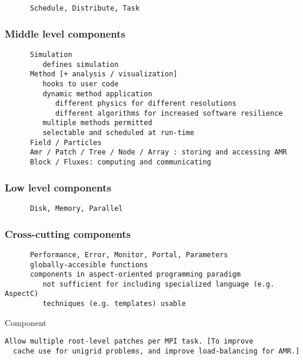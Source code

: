 \documentclass{article}
\begin{document}
\begin{verbatim}
      Schedule, Distribute, Task
\end{verbatim}

\subsubsection{Middle level components}

\begin{verbatim}
      Simulation
         defines simulation
      Method [+ analysis / visualization]
         hooks to user code
         dynamic method application
            different physics for different resolutions
            different algorithms for increased software resilience
         multiple methods permitted
         selectable and scheduled at run-time
      Field / Particles 
      Amr / Patch / Tree / Node / Array : storing and accessing AMR
      Block / Fluxes: computing and communicating
\end{verbatim}

\subsubsection{Low level components}

\begin{verbatim}
      Disk, Memory, Parallel      
\end{verbatim}

\subsubsection{Cross-cutting components}

\begin{verbatim}
      Performance, Error, Monitor, Portal, Parameters
      globally-accesible functions
      components in aspect-oriented programming paradigm
         not sufficient for including specialized language (e.g. AspectC)
         techniques (e.g. templates) usable
\end{verbatim}
 Component

\begin{verbatim}
Allow multiple root-level patches per MPI task. [To improve
  cache use for unigrid problems, and improve load-balancing for AMR.]
\end{verbatim}
\end{document}
